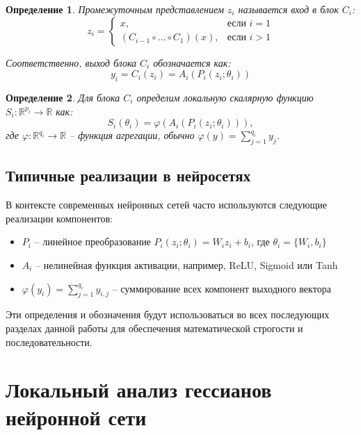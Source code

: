 \documentclass[a4paper,12pt]{article}
\newtheorem{definition}{Определение}
\begin{document}
\begin{definition}
Промежуточным представлением $z_i$ называется вход в блок $C_i$:
\begin{equation}
    z_i = 
    \begin{cases}
    x, & \text{если } i = 1 \\
    (C_{i-1} \circ \ldots \circ C_1)(x), & \text{если } i > 1
    \end{cases}
\end{equation}

Соответственно, выход блока $C_i$ обозначается как:
\begin{equation}
    y_i = C_i(z_i) = A_i(P_i(z_i; \theta_i))
\end{equation}
\end{definition}

\begin{definition}
Для блока $C_i$ определим локальную скалярную функцию $S_i: \mathbb{R}^{p_i} \rightarrow \mathbb{R}$ как:
\begin{equation}
    S_i(\theta_i) = \varphi(A_i(P_i(z_i; \theta_i))),
\end{equation}
где $\varphi: \mathbb{R}^{q_i} \rightarrow \mathbb{R}$ -- функция агрегации, обычно $\varphi(y) = \sum_{j=1}^{q_i} y_j$.
\end{definition}

\subsection{Типичные реализации в нейросетях}

В контексте современных нейронных сетей часто используются следующие реализации компонентов:
\begin{itemize}
\item $P_i$ -- линейное преобразование $P_i(z_i; \theta_i) = W_i z_i + b_i$, где $\theta_i = \{W_i, b_i\}$
\item $A_i$ -- нелинейная функция активации, например, ReLU, Sigmoid или Tanh
\item $\varphi(y_i) = \sum_{j=1}^{q_i} y_{i,j}$ -- суммирование всех компонент выходного вектора
\end{itemize}

Эти определения и обозначения будут использоваться во всех последующих разделах данной работы для обеспечения математической строгости и последовательности.

\section{Локальный анализ гессианов нейронной сети}
\end{document}

